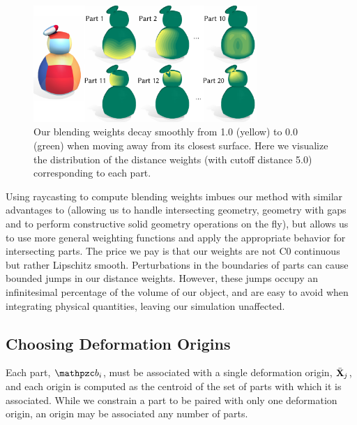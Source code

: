 \begin{figure}[h]
    \centering
    \includegraphics[width=3.33in]{figures/distance_weight_puft.pdf}
    \caption{Our blending weights decay smoothly from 1.0 (yellow) to 0.0 (green) when moving away from its closest surface. Here we visualize the distribution of the distance weights (with cutoff distance 5.0) corresponding to each part.   
    }
    \label{fig:distance_weight_puft}
    \vspace{-5pt}
  \end{figure} 

Using raycasting to compute blending weights imbues our method with similar advantages to \citet{Sawhney:2020:MCG} (allowing us to 
handle intersecting geometry, geometry with gaps and to perform constructive solid geometry operations on the fly),
but allows us to use more general weighting functions and apply the appropriate behavior for intersecting parts.
The price we pay is that our weights are not C0 continuous but rather Lipschitz smooth.
Perturbations in the boundaries of parts can cause bounded jumps in our distance weights. 
However, these jumps occupy an infinitesimal percentage of the volume of our object, and are easy to avoid when integrating
physical quantities, leaving our simulation unaffected. 

\subsection{Choosing Deformation Origins}
\label{sec:origins}
Each part, $\prt_i$, must be associated with a single deformation origin, $\bar{\mathbf{X}}_j$, and each origin is computed as the centroid of the set of parts with which it is associated. 
While we constrain a part to be paired with only one deformation origin, an origin may be associated any number of parts. 

